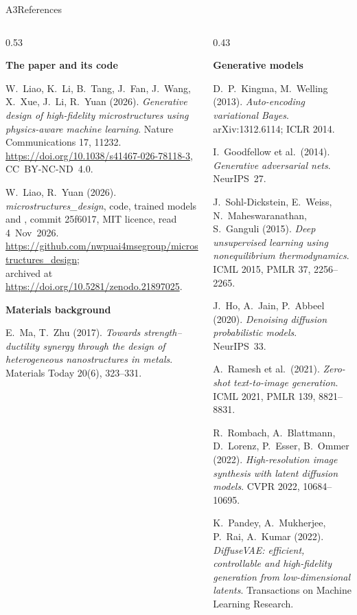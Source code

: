 \begin{frame}{A3\enspace References}
  \begin{columns}[T,onlytextwidth]
  \begin{column}{0.53\textwidth}
  \scriptsize\setlength\parskip{0.6mm}\raggedright
  \textbf{The paper and its code}\par
  W.~Liao, K.~Li, B.~Tang, J.~Fan, J.~Wang, X.~Xue, J.~Li, R.~Yuan (2026). \emph{Generative design of high-fidelity
  microstructures using physics-aware machine learning}. Nature Communications 17, 11232.
  \url{https://doi.org/10.1038/s41467-026-78118-3}, CC~BY-NC-ND~4.0.\par
  W.~Liao, R.~Yuan (2026). \emph{microstructures\_design}, code, trained models and , commit 25f6017,
  MIT licence, read 4~Nov~2026.\\ \url{https://github.com/nwpuai4msegroup/microstructures_design};\\ archived at
  \url{https://doi.org/10.5281/zenodo.21897025}.\par
  \textbf{Materials background}\par
  E.~Ma, T.~Zhu (2017). \emph{Towards strength--ductility synergy through the design of heterogeneous nanostructures
  in metals}. Materials Today 20(6), 323--331.\par
  \end{column}
  \begin{column}{0.43\textwidth}
  \scriptsize\setlength\parskip{0.4mm}\raggedright
  \textbf{Generative models}\par
  D.~P.~Kingma, M.~Welling (2013). \emph{Auto-encoding variational Bayes}. arXiv:1312.6114; ICLR 2014.\par
  I.~Goodfellow et al.\ (2014). \emph{Generative adversarial nets}. NeurIPS~27.\par
  J.~Sohl-Dickstein, E.~Weiss, N.~Maheswaranathan, S.~Ganguli (2015). \emph{Deep unsupervised learning using
  nonequilibrium thermodynamics}. ICML 2015, PMLR 37, 2256--2265.\par
  J.~Ho, A.~Jain, P.~Abbeel (2020). \emph{Denoising diffusion probabilistic models}. NeurIPS~33.\par
  A.~Ramesh et al.\ (2021). \emph{Zero-shot text-to-image generation}. ICML 2021, PMLR 139, 8821--8831.\par
  R.~Rombach, A.~Blattmann, D.~Lorenz, P.~Esser, B.~Ommer (2022). \emph{High-resolution image synthesis with latent
  diffusion models}. CVPR 2022, 10684--10695.\par
  K.~Pandey, A.~Mukherjee, P.~Rai, A.~Kumar (2022). \emph{DiffuseVAE: efficient, controllable and high-fidelity
  generation from low-dimensional latents}. Transactions on Machine Learning Research.\par
  \end{column}
  \end{columns}
\end{frame}

